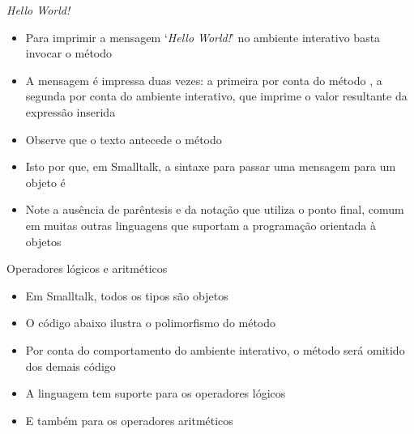 \begin{frame}[fragile]{\it Hello World!}

    \begin{itemize}
        \item Para imprimir a mensagem `\textit{Hello World!}' no ambiente interativo basta
            invocar o método 


        \item A mensagem é impressa duas vezes: a primeira por conta do método 
            , a segunda por conta do ambiente interativo, que imprime
            o valor resultante da expressão inserida

        \item Observe que o texto antecede o método

        \item Isto por que, em Smalltalk, a sintaxe para passar uma mensagem para um objeto é


        \item Note a ausência de parêntesis e da notação que utiliza o ponto final, comum em
            muitas outras linguagens que suportam a programação orientada à objetos
    \end{itemize}

\end{frame}

\begin{frame}[fragile]{Operadores lógicos e aritméticos}

    \begin{itemize}
        \item Em Smalltalk, todos os tipos são objetos

        \item O código abaixo ilustra o polimorfismo do método 


        \item Por conta do comportamento do ambiente interativo, o método 
            será omitido dos demais código

        \item A linguagem tem suporte para os operadores lógicos


        \item E também para os operadores aritméticos

    \end{itemize}

\end{frame}

